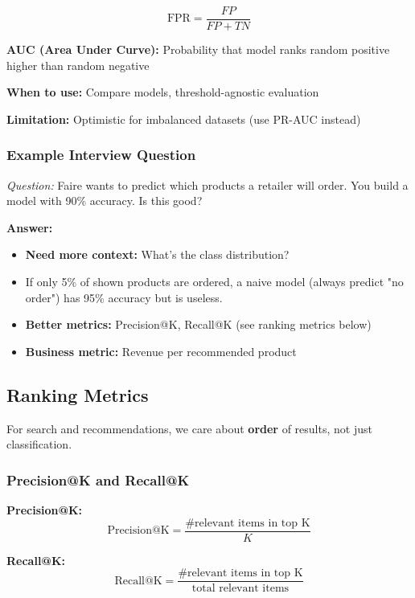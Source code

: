 \documentclass[11pt,letterpaper]{article}
\begin{document}
\begin{equation}
\text{FPR} = \frac{FP}{FP + TN}
\end{equation}

\textbf{AUC (Area Under Curve):} Probability that model ranks random positive higher than random negative

\textbf{When to use:} Compare models, threshold-agnostic evaluation

\textbf{Limitation:} Optimistic for imbalanced datasets (use PR-AUC instead)

\subsubsection{Example Interview Question}

\textit{Question:} Faire wants to predict which products a retailer will order. You build a model with 90\% accuracy. Is this good?

\textbf{Answer:}
\begin{itemize}
    \item \textbf{Need more context:} What's the class distribution?
    \item If only 5\% of shown products are ordered, a naive model (always predict "no order") has 95\% accuracy but is useless.
    \item \textbf{Better metrics:} Precision@K, Recall@K (see ranking metrics below)
    \item \textbf{Business metric:} Revenue per recommended product
\end{itemize}

\subsection{Ranking Metrics}

For search and recommendations, we care about \textbf{order} of results, not just classification.

\subsubsection{Precision@K and Recall@K}

\textbf{Precision@K:}
\begin{equation}
\text{Precision@K} = \frac{\text{\# relevant items in top K}}{K}
\end{equation}

\textbf{Recall@K:}
\begin{equation}
\text{Recall@K} = \frac{\text{\# relevant items in top K}}{\text{total relevant items}}
\end{equation}
\end{document}
